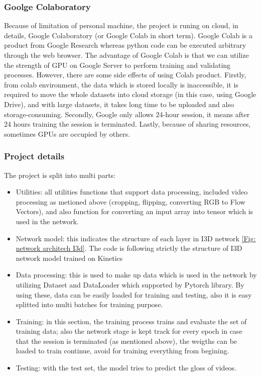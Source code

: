 \documentclass[a4paper, 12pt]{article}
\begin{document}
\subsubsection{Goolge Colaboratory}
Because of limitation of personal machine, the project is runing on cloud, in details, Google Colaboratory (or Google Colab in short term). Google Colab is a product from Google Research whereas python code can be executed arbitrary through the web browser. The advantage of Google Colab is that we can utilize the strength of GPU on Google Server to perform training and validating processes. However, there are some side effects of using Colab product. Firstly, from colab environment, the data which is stored locally is inaccessible, it is required to move the whole datasets into cloud storage (in this case, using Google Drive), and with large datasets, it takes long time to be uploaded and also storage-consuming. Secondly, Google only allows 24-hour session, it means after 24 hours training the session is terminated. Lastly, because of sharing resources, sometimes GPUs are occupied by others.

\subsubsection{Project details}
The project is split into multi parts:

\begin{itemize}
    \item Utilities: all utilities functions that support data processing, included video processing as metioned above (cropping, flipping, converting RGB to Flow Vectors), and also function for converting an input array into tensor which is used in the network.
    \item Network model: this indicates the structure of each layer in I3D network \ref{Fig: network architech I3d}. The code is following strictly the structure of I3D network model trained on Kinetics \citep{szegedy2015going}
    \item Data processing: this is used to make up data which is used in the network by utilizing Dataset and DataLoader which supported by Pytorch library. By using these, data can be easily loaded for training and testing, also it is easy splitted into multi batches for training purpose.
    \item Training: in this section, the training process trains and evaluate the set of training data; also the network stage is kept track for every epoch in case that the session is terminated (as mentioned above), the weigths can be loaded to train continue, avoid for training everything from begining.
    \item Testing: with the test set, the model tries to predict the gloss of videos.
\end{itemize}
\end{document}
